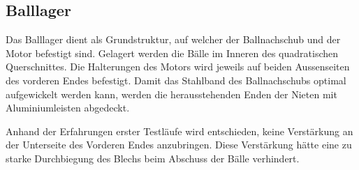 \subsection{Balllager}
Das Balllager dient als Grundstruktur, auf welcher der Ballnachschub und der Motor befestigt sind. Gelagert werden die Bälle im Inneren des quadratischen Querschnittes. Die Halterungen des Motors wird jeweils auf 
beiden Aussenseiten des vorderen Endes befestigt. Damit das Stahlband des Ballnachschubs optimal aufgewickelt werden kann, werden die herausstehenden Enden der Nieten mit Aluminiumleisten abgedeckt.

Anhand der Erfahrungen erster Testläufe wird entschieden, keine Verstärkung an der Unterseite des Vorderen Endes anzubringen. Diese Verstärkung hätte eine zu starke Durchbiegung des Blechs beim Abschuss der Bälle verhindert.

